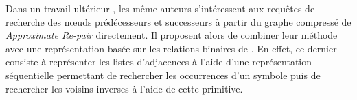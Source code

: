 
	Dans un travail ultérieur \citep{claude2010extended} , les même auteurs s'intéressent aux requêtes de recherche des nœuds prédécesseurs et successeurs à partir du graphe compressé de \textit{Approximate Re-pair} directement. Il proposent alors de combiner leur méthode avec une représentation basée sur les relations binaires de \citep{barbay2006adaptive}. En effet, ce dernier consiste à représenter les listes d'adjacences à l'aide d'une représentation séquentielle permettant de rechercher les occurrences d'un symbole puis de rechercher les voisins inverses à l'aide de cette primitive. 